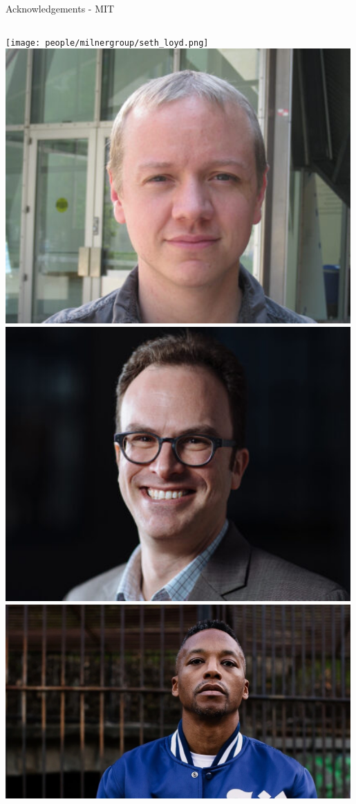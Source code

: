 \documentclass[aspectratio=169]{beamer}
\begin{document}
\begin{frame}{Acknowledgements - MIT}
\begin{columns}
            \texttt{[image: people/milnergroup/seth\_loyd.png]}
            \centering
            \includegraphics[width=0.99\textwidth]{people/milnergroup/mike.png}
            \includegraphics[width=0.99\textwidth]{people/milnergroup/thaler.png}
            \centering
            \includegraphics[width=0.99\textwidth]{people/milnergroup/lupe.png}

\end{columns}
\end{frame}
\end{document}
